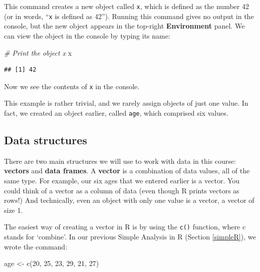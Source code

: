 \documentclass[
]{memoir}
\newenvironment{Shaded}{\begin{snugshade}}{\end{snugshade}}
\newcommand{\CommentTok}[1]{\textcolor[rgb]{0.56,0.35,0.01}{\textit{#1}}}
\newcommand{\DecValTok}[1]{\textcolor[rgb]{0.00,0.00,0.81}{#1}}
\newcommand{\FunctionTok}[1]{\textcolor[rgb]{0.00,0.00,0.00}{#1}}
\newcommand{\NormalTok}[1]{#1}
\newcommand{\OtherTok}[1]{\textcolor[rgb]{0.56,0.35,0.01}{#1}}
\begin{document}
This command creates a new object called \texttt{x}, which is defined as the number 42 (or in words, ``\texttt{x} is defined as 42''). Running this command gives no output in the console, but the new object appears in the top-right \textbf{Environment} panel. We can view the object in the console by typing its name:

\begin{Shaded}
\begin{Highlighting}[]
\CommentTok{\# Print the object x}
\NormalTok{x}
\end{Highlighting}
\end{Shaded}

\begin{verbatim}
## [1] 42
\end{verbatim}

Now we see the contents of \texttt{x} in the console.

This example is rather trivial, and we rarely assign objects of just one value. In fact, we created an object earlier, called \texttt{age}, which comprised six values.

\hypertarget{data-structures}{%
\subsection{Data structures}\label{data-structures}}

There are two main structures we will use to work with data in this course: \textbf{vectors} and \textbf{data frames}. A \textbf{vector} is a combination of data values, all of the same type. For example, our six ages that we entered earlier is a vector. You could think of a vector as a column of data (even though R prints vectors as rows!) And technically, even an object with only one value is a vector, a vector of size 1.

The easiest way of creating a vector in R is by using the \texttt{c()} function, where c stands for `combine'. In our previous Simple Analysis in R (Section \ref{simpleR}), we wrote the command:

\begin{Shaded}
\begin{Highlighting}[]
\NormalTok{age }\OtherTok{\textless{}{-}} \FunctionTok{c}\NormalTok{(}\DecValTok{20}\NormalTok{, }\DecValTok{25}\NormalTok{, }\DecValTok{23}\NormalTok{, }\DecValTok{29}\NormalTok{, }\DecValTok{21}\NormalTok{, }\DecValTok{27}\NormalTok{)}
\end{Highlighting}
\end{Shaded}
\end{document}
